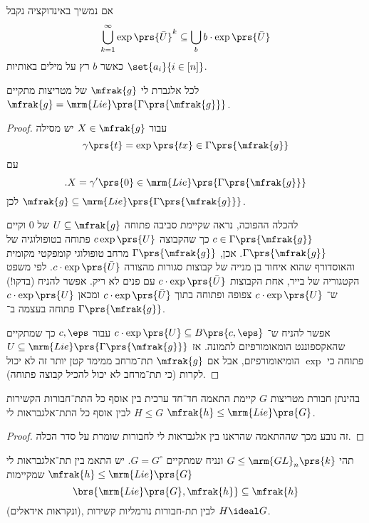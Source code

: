 \documentclass[10pt, twoside]{book}
\begin{document}
אם נמשיך באינדוקציה נקבל
\[\bigcup_{k=1}^{\infty} \exp\prs{\bar{U}}^k \subseteq \bigcup_b b \cdot \exp\prs{\bar{U}}\]
כאשר
$b$
רץ על מילים באותיות
$\set{a_i}{i \in [n]}$.

\begin{theorem}
לכל אלגברת לי
$\mfrak{g}$
של מטריצות מתקיים
$\mfrak{g} = \mrm{Lie}\prs{\Gamma\prs{\mfrak{g}}}$.
\end{theorem}

\begin{proof}
עבור
$X \in \mfrak{g}$
יש מסילה
\[\gamma\prs{t} = \exp\prs{tx} \in \Gamma\prs{\mfrak{g}}\]
עם
\[\text{.} X = \gamma'\prs{0} \in \mrm{Lie}\prs{\Gamma\prs{\mfrak{g}}}\]
לכן
$\mfrak{g} \subseteq \mrm{Lie}\prs{\Gamma\prs{\mfrak{g}}}$.

להכלה ההפוכה, נראה שקיימת סביבה פתוחה
$U \subseteq \mfrak{g}$
של
$0$
וקיים
$c \in \Gamma\prs{\mfrak{g}}$
כך שהקבוצה
$c \exp\prs{U}$
פתוחה בטופולוגיה של
$\Gamma\prs{\mfrak{g}}$.
אכן,
$\Gamma\prs{\mfrak{g}}$
מרחב טופולוגי קומפקטי מקומית והאוסדורף שהוא איחוד בן מנייה של קבוצות סגורות מהצורה
$c \cdot \exp\prs{\bar{U}}$.
לפי משפט הקטגוריה של בייר, אחת הקבוצות
$c \cdot \exp\prs{\bar{U}}$
עם פנים לא ריק.
אפשר להניח (בדקו!) ש־%
$c \cdot \exp\prs{U}$
צפופה ופתוחה בתוך
$c \cdot \exp\prs{\bar{U}}$
ומכאן
$c \cdot \exp\prs{U}$
פתוחה בעצמה ב־%
$\Gamma\prs{\mfrak{g}}$.

אפשר להניח ש־%
$c \cdot \exp\prs{U} \subseteq B\prs{c, \eps}$
עבור
$c,\eps$
כך שמתקיים שהאקספוננט הומאומורפיזם לתמונה.
אז
$U \subseteq \mrm{Lie}\prs{\Gamma\prs{\mfrak{g}}}$
פתוחה כי
$\exp$
הומיאומורפיזם, אבל אם
$\mfrak{g}$
תת־מרחב ממימד קטן יותר זה לא יכול לקרות (כי תת־מרחב לא יכול להכיל קבוצה פתוחה).
\end{proof}

\begin{theorem}
בהינתן חבורת מטריצות
$G$
קיימת התאמה חד־חד ערכית בין אוסף כל התת־חבורות הקשירות
$H \leq G$
לבין אוסף כל התת־אלגבראות לי
$\mfrak{h} \leq \mrm{Lie}\prs{G}$.
\end{theorem}

\begin{proof}
זה נובע מכך שההתאמה שהראנו בין אלגבראות לי לחבורות שומרת על סדר הכלה.
\end{proof}

\begin{proposition}
תהי
$G \leq \mrm{GL}_n\prs{k}$
ונניח שמתקיים
$G = G^\circ$.
יש התאמ בין תת־אלגבראות לי
$\mfrak{h} \leq \mrm{Lie}\prs{G}$
שמקיימות
\[\brs{\mrm{Lie}\prs{G}, \mfrak{h}} \subseteq \mfrak{h}\]
(ונקראות אידאלים), לבין תת-חבורות נורמליות קשירות
$H \ideal G$.
\end{proposition}
\end{document}

